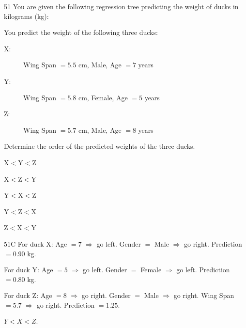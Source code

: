 \begin{question}{51}
You are given the following regression tree predicting the weight of ducks in kilograms (kg):


You predict the weight of the following three ducks:
\begin{description}
\item[X:] Wing Span $= 5.5$ cm, Male, Age $= 7$ years
\item[Y:] Wing Span $= 5.8$ cm, Female, Age $= 5$ years
\item[Z:] Wing Span $= 5.7$ cm, Male, Age $= 8$ years
\end{description}

Determine the order of the predicted weights of the three ducks.

\begin{choices}
\item $\mathrm{X} < \mathrm{Y} < \mathrm{Z}$
\item $\mathrm{X} < \mathrm{Z} < \mathrm{Y}$
\item $\mathrm{Y} < \mathrm{X} < \mathrm{Z}$
\item $\mathrm{Y} < \mathrm{Z} < \mathrm{X}$
\item $\mathrm{Z} < \mathrm{X} < \mathrm{Y}$
\end{choices}
\end{question}
\begin{solution}{51}{C}
For duck X: Age $= 7$ $\Rightarrow$ go left. Gender $=$ Male $\Rightarrow$ go right. Prediction $= 0.90$ kg.

For duck Y: Age $= 5$ $\Rightarrow$ go left. Gender $=$ Female $\Rightarrow$ go left. Prediction $= 0.80$ kg.

For duck Z: Age $= 8$ $\Rightarrow$ go right. Gender $=$ Male $\Rightarrow$ go right. Wing Span $= 5.7$ $\Rightarrow$ go right. Prediction $= 1.25$.

$Y < X < Z$.
\end{solution}

